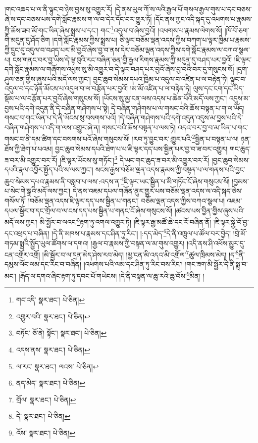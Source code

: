 །གང་འཆད་པ་ལ་ནི་ལྟུང་བ་ཉེས་བྱས་སུ་འགྱུར་རོ། །དེ་ནས་ཡུལ་ཀོ་ས་ལའི་རྒྱལ་པོ་གསལ་རྒྱལ་གུས་པ་དང་བཅས་ཞེ་ས་དང་བཅས་པས་དགེ་སློང་རྣམས་ག་ལ་བ་དེར་དོང་བར་གྱུར་ཏོ། །དོང་ནས་ཀྱང་འདི་སྐད་དུ་འཕགས་པ་རྣམས་ཀྱི་ཆོས་ཟབ་མོ་གང་ཡིན་ཞེས་སྨྲས་པ་དང་། གང་\footnote{གང་འདི་  སྣར་ཐང་།  པེ་ཅིན། }འདུལ་བ་ཞེས་བྱའོ། །འཕགས་པ་རྣམས་ལེགས་སོ། །ཁོ་བོ་ཅག་གི་མདུན་དུ་ཤོད་ཅིག །དགེ་སློང་རྣམས་ཀྱིས་སྨྲས་པ། ཅི་ལྟར་བཅོམ་ལྡན་འདས་ཀྱིས་བཀག་པ་ལྟར་ཁྱིམ་པ་རྣམས་ཀྱི་དྲུང་དུ་འདུལ་བ་བཤད་པར་མི་བྱའོ་ཞེས་བྱ་བ་ནས་དེར་བཅོམ་ལྡན་འདས་ཀྱིས་དགེ་སློང་རྣམས་ལ་བཀའ་སྩལ་པ། ངས་གནང་བར་བྱ་ཡིས་དེ་ལྟ་བུའི་རང་བཞིན་ཅན་གྱི་རྒྱལ་རིགས་རྣམས་ཀྱི་མདུན་དུ་བཤད་པར་བྱའོ། །ཇི་ལྟར་དགེ་སློང་རྣམས་ལ་གཞོགས་འཕྱས་སུ་མི་འགྱུར་བ་དེ་ལྟར་བཤད་པར་བྱའོ་ཞེས་བྱ་བའི་བར་དུ་གསུངས་སོ། །དྲག་ཤུལ་ཅན་གྱིས་ཞུས་པའི་མདོ་ལས་ཀྱང་། བྱང་ཆུབ་སེམས་དཔའ་ཁྱིམ་པ་འདུལ་བ་འཛིན་པ་ལ་བརྟེན་ཏེ། ལྟུང་བ་འདུལ་བ་དང་ཉོན་མོངས་པ་འདུལ་བ་ལ་བརྩོན་པར་བྱའོ། །མ་མོ་འཛིན་པ་ལ་བརྟེན་ཏེ། ལུས་དང་ངག་དང་ཡིད་སྡོམ་པ་ལ་བརྩོན་པར་བྱའོ་ཞེས་གསུངས་སོ། །ཡོངས་སུ་མྱ་ངན་ལས་འདས་པ་ཆེན་པོའི་མདོ་ལས་ཀྱང་། འདུས་མ་བྱས་པའི་དགེ་འདུན་ནི་དེ་བཞིན་གཤེགས་པ་སྟེ། དེ་བཞིན་གཤེགས་པ་ལ་གསང་བའི་ཆོས་བསྟན་པ་ག་ལ་ཡོད། གསང་བ་གང་ཡིན་པ་དེ་ནི་ཡོངས་སུ་བསགས་པའོ། །དེ་བཞིན་གཤེགས་པའི་དགེ་འདུན་འདུས་མ་བྱས་པའི་དེ་བཞིན་གཤེགས་པ་འདི་ག་ལས་འགྱུར་ཞེ་ན། གསང་བའི་ཆོས་བསྟན་པ་ལས་ཏེ། འདའ་བར་བྱ་བ་མ་ཡིན་པ་གང་གསང་བ་ནི་དམ་ཚིག་དང་བསགས་པའོ་ཞེས་གསུངས་སོ། །རབ་ཏུ་བྱུང་བར་:གྱུར་པའི་\footnote{འགྱུར་བའི་  སྣར་ཐང་།  པེ་ཅིན། }སྦྱིན་པ་བསྟན་པ་ལ། ཉན་ཐོས་ཀྱི་ཐེག་པ་པའམ། བྱང་ཆུབ་སེམས་དཔའི་ཐེག་པ་པ་ཇི་ལྟར་དད་པས་སྦྱིན་པར་བྱ་བ་ཟ་བར་འགྱུར། གང་ཆུད་ཟ་བར་མི་འགྱུར་བར་རོ། །ཇི་ལྟར་ཡོངས་སུ་གཏོང་།\footnote{བཏོང་  ཅོ་ནེ། སྟོང་།  སྣར་ཐང་།  པེ་ཅིན། } དེ་ཡང་གང་ཆུད་ཟ་བར་མི་འགྱུར་བར་རོ། །བྱང་ཆུབ་སེམས་དཔའི་རྣལ་འབྱོར་སྤྱོད་པའི་ས་ལས་ཀྱང་། སངས་རྒྱས་བཅོམ་ལྡན་འདས་རྣམས་ཀྱི་བསྟན་པ་ལ་གནས་པའི་བྱང་ཆུབ་སེམས་དཔའ་རྣམས་ནི་བསླབ་པ་ལས་:འདས་ན་\footnote{འདས་ནས་  སྣར་ཐང་།  པེ་ཅིན། }ཇི་ལྟར་ཡང་སྦྱིན་པ་མི་གཏོང་ངོ་ཞེས་གསུངས་སོ། །བྱམས་པ་སེང་གེ་སྒྲའི་མདོ་ལས་ཀྱང་། དེ་ནས་འཇམ་དཔལ་གཞོན་ནུར་གྱུར་པས་བཅོམ་ལྡན་འདས་ལ་འདི་སྐད་ཅེས་གསོལ་ཏོ། །བཅོམ་ལྡན་འདས་ཇི་ལྟར་དད་པས་སྦྱིན་པ་གནང་། བཅོམ་ལྡན་འདས་ཀྱིས་བཀའ་སྩལ་པ། འཇམ་དཔལ་སྦྱོར་བ་དང་གྲོལ་བ་ལ་ངས་དད་པས་སྦྱིན་པ་གནང་ངོ་ཞེས་གསུངས་སོ། །ཚངས་པས་བྱིན་གྱིས་ཞུས་པའི་མདོ་ལས་ཀྱང་། མི་སྦྱོར་བ་ལའང་\footnote{ལ་རང་  སྣར་ཐང་། ལའས་  པེ་ཅིན། }རྟག་ཏུ་འགལ་འགྱུར་ཏེ། །ཇི་ལྟར་རྒྱ་མཚོ་ཆེ་དང་རོ་བཞིན་ནོ། །ཇི་ལྟར་སྐྱེ་བོ་བྱ་དང་འཕྲད་པ་བཞིན། །དེ་ནི་མཁས་པ་རྣམས་དང་ཤིན་ཏུ་རིང་། །:དད་མེད་\footnote{ནད་མེད་  སྣར་ཐང་།  པེ་ཅིན། }དེ་ནི་འཁྲུལ་པ་ཚོལ་བར་བྱེད། །བྲེ་མོ་གཏམ་སྨྲའི་སྤྱོད་ཡུལ་ཚོགས་ལ་དགའ། །རྒྱལ་བ་རྣམས་ཀྱི་བསྟན་ལ་མ་གུས་འགྱུར། །འདི་ནས་ཤི་འཕོས་མྱུར་དུ་ངན་འགྲོར་འགྲོ། །མི་སྦྱོར་བ་ལ་དྲན་མེད་ཤེས་རབ་མེད། །མྱ་ངན་མི་འདའ་མི་འགྲོལ་\footnote{གྲོལ་  སྣར་ཐང་།  པེ་ཅིན། }ཚུལ་ཁྲིམས་མེད། །ད་\footnote{དེ་  སྣར་ཐང་།  པེ་ཅིན། }ནི་དམུས་ལོང་ལམ་དང་རིང་བ་བཞིན། །འཕགས་པའི་ལམ་དང་ཤིན་ཏུ་རིང་བས་རིང་། །གང་ཟག་མི་སྦྱོར་དེ་ནི་སྨྲ་བ་མང་། །རྒོད་ལ་དགའ་ཞིང་རྟག་ཏུ་དབང་པོ་གཡེངས། །དེ་ནི་བསྟན་ལ་ཆུ་རའི་ཆུ་བོས་\footnote{འོས་  སྣར་ཐང་།  པེ་ཅིན། }མིན། །
